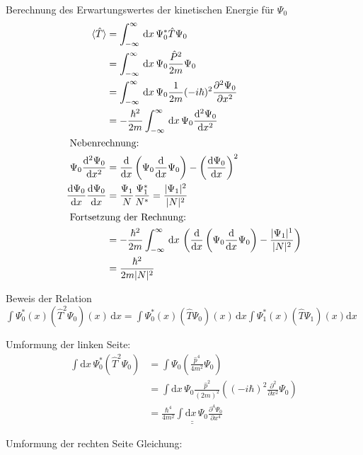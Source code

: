  Berechnung des Erwartungswertes der kinetischen Energie für $\Psi _0$
\begin{align}
\langle \hat T \rangle &= \int_{-\infty}^{\infty} \,\mathrm{d}x\, \Psi _0^* \hat T \Psi _0\\
&= \int_{-\infty}^{\infty} \,\mathrm{d}x\, \Psi _0 \frac{\hat P ^2}{2m} \Psi _0 \nonumber\\
&=\int_{-\infty}^{\infty} \,\mathrm{d}x\, \Psi _0\frac{1}{2m}(\--i\hbar)^2 \frac{\partial ^2 \Psi _0}{\partial x^2} \nonumber\\
&= \--\frac{\hbar ^2}{2m} \int_{-\infty}^{\infty} \,\mathrm{d}x\, \Psi _0 \frac{\mathrm{d}^2 \Psi _0}{\mathrm{d}x^2} \nonumber\\
\intertext{
    Nebenrechnung:
}
\Psi _0 \frac{\mathrm{d}^2 \Psi _0}{\mathrm{d}x^2}&= \frac{\mathrm{d}}{\mathrm{d}x}\left(\Psi _0 \frac{\mathrm{d}}{\mathrm{d}x} \Psi _0\right)
-\left(\frac{\mathrm{d}\Psi _0}{\mathrm{d}x}\right)^2\\
\frac{\mathrm{d}\Psi _0}{\mathrm{d}x} \frac{\mathrm{d}\Psi _0}{\mathrm{d}x} &= \frac{\Psi _1}{N} \frac{\Psi _1^*}{N^*}=\frac{\lvert\Psi _1\rvert^2}{\lvert N\rvert^2}\\
\intertext{
    Fortsetzung der Rechnung:
}
&=\-- \frac{\hbar ^2}{2m}\int_{-\infty}^{\infty} \,\mathrm{d}x\, \left(\frac{\mathrm{d}}{\mathrm{d}x}\left(\Psi _0 \frac{\mathrm{d}}{\mathrm{d}x} \Psi _0\right)-\frac{\lvert\Psi _1\rvert^1}{\lvert N\rvert^2} \right) \nonumber\\
&=\frac{\hbar ^2}{2m \lvert N\rvert^2}
\end{align}

Beweis der Relation $\int \Psi _0^*(x)(\hat T ^2 \Psi _0)(x)\,\mathrm{d}x = \int \Psi_0^*(x) (\hat T \Psi _0 )(x) \,\mathrm{d}x \int \Psi _1^* (x)(\hat T \Psi _1)(x)\mathrm{d}x $

Umformung der linken Seite:
\begin{align}
    \int \mathrm{d}x \,\Psi _0^* (\hat T ^2 \Psi _0 ) &= \int \Psi _0 \left(\frac{\hat p ^4}{4m^2}\Psi _0 \right)\\
    &=\int \mathrm{d}x \,\Psi _0 \frac{\hat p ^2}{(2m)^2} \left((-i \hbar)^2 \frac{\partial ^2}{\partial x^2} \Psi _0 \right) \nonumber\\   
    &=\underline{\underline{\frac{\hbar ^4}{4m^2}\int \mathrm{d}x \,\Psi _0 \frac{\partial ^4 \Psi _0}{\partial x^4}}}
\end{align}

Umformung der rechten Seite Gleichung:

